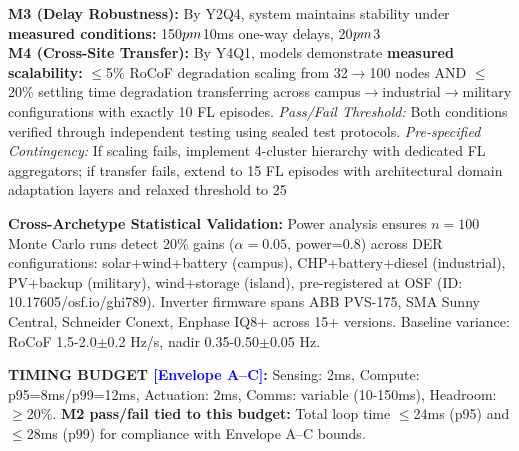\documentclass[12pt]{article}
\begin{document}
\textbf{M3 (Delay Robustness):} By Y2Q4, system maintains stability under \textbf{measured conditions:} 150$\\pm$10ms one-way delays, 20$\\pm$3\\%

\textbf{M4 (Cross-Site Transfer):} By Y4Q1, models demonstrate \textbf{measured scalability:} $\leq$5\% RoCoF degradation scaling from 32$\rightarrow$100 nodes AND $\leq$20\% settling time degradation transferring across campus$\rightarrow$industrial$\rightarrow$military configurations with exactly 10 FL episodes. \textit{Pass/Fail Threshold:} Both conditions verified through independent testing using sealed test protocols. \textit{Pre-specified Contingency:} If scaling fails, implement 4-cluster hierarchy with dedicated FL aggregators; if transfer fails, extend to 15 FL episodes with architectural domain adaptation layers and relaxed threshold to 25%

\textbf{Cross-Archetype Statistical Validation:} Power analysis ensures $n=100$ Monte Carlo runs detect 20\% gains ($\alpha=0.05$, power=0.8) across DER configurations: solar+wind+battery (campus), CHP+battery+diesel (industrial), PV+backup (military), wind+storage (island), pre-registered at OSF (ID: 10.17605/osf.io/ghi789). Inverter firmware spans ABB PVS-175, SMA Sunny Central, Schneider Conext, Enphase IQ8+ across 15+ versions. Baseline variance: RoCoF 1.5-2.0$\pm$0.2 Hz/s, nadir 0.35-0.50$\pm$0.05 Hz.

\begin{center}
\colorbox{yellow!20}{\begin{minipage}{0.95\textwidth}
\textbf{TIMING BUDGET \textcolor{blue}{[Envelope A--C]}:} Sensing: 2ms, Compute: p95=8ms/p99=12ms, Actuation: 2ms, Comms: variable (10-150ms), Headroom: $\geq$20\%. \textbf{M2 pass/fail tied to this budget:} Total loop time $\leq$24ms (p95) and $\leq$28ms (p99) for compliance with Envelope A--C bounds.
\end{minipage}}
\end{center}
\end{document}
